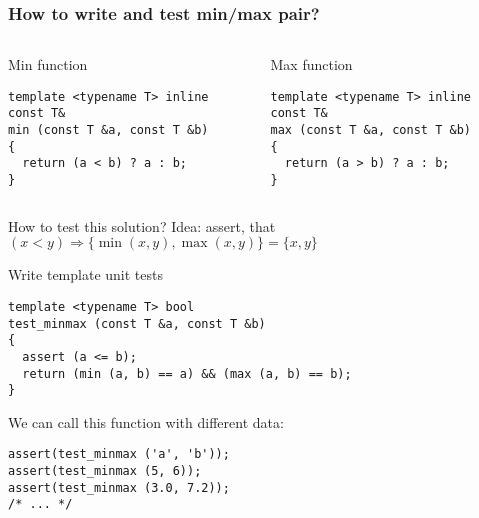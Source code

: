 \documentclass{beamer}
\begin{document}
\begin{frame}[fragile]
\frametitle{How to write and test min/max pair?}

\begin{columns}[c]
\begin{column}{.5\textwidth}
\begin{block}{Min function}
\begin{lstlisting}[basicstyle=\tiny]
template <typename T> inline const T&
min (const T &a, const T &b)
{
  return (a < b) ? a : b;
}
\end{lstlisting}
\end{block}
\end{column}
\begin{column}{.5\textwidth}
\begin{block}{Max function}
\begin{lstlisting}[basicstyle=\tiny]
template <typename T> inline const T&
max (const T &a, const T &b)
{
  return (a > b) ? a : b;
}
\end{lstlisting}
\end{block}
\end{column}
\end{columns}\pause

\begin{alertblock}{How to test this solution?}
Idea: assert, that $(x<y) \Rightarrow \{\min(x,y),\max(x,y)\}=\{x,y\}$
\end{alertblock}\pause

\begin{block}{Write template unit tests}
\begin{lstlisting}[basicstyle=\tiny]
template <typename T> bool
test_minmax (const T &a, const T &b)
{
  assert (a <= b);
  return (min (a, b) == a) && (max (a, b) == b);
}
\end{lstlisting}

We can call this function with different data:
\begin{lstlisting}[basicstyle=\tiny]
assert(test_minmax ('a', 'b'));
assert(test_minmax (5, 6));
assert(test_minmax (3.0, 7.2));
/* ... */
\end{lstlisting}
\end{block}

\end{frame}
\end{document}
